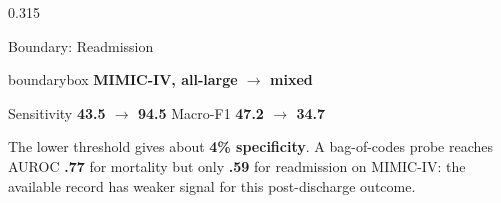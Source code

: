 \documentclass[final,xcolor=table]{beamer}
\begin{document}
\begin{frame}[t]
\begin{columns}[t,totalwidth=\textwidth]
\begin{column}{0.315\textwidth}
    \vspace{0.27cm}

    \begin{block}{Boundary: Readmission}
      \begin{beamercolorbox}[wd=\linewidth,rounded=true,sep=0.45em]{boundarybox}
        \centering
        \textbf{MIMIC-IV, all-large $\rightarrow$ mixed}\par\vspace{0.16em}
        Sensitivity \textbf{43.5 $\rightarrow$ 94.5}\quad
        Macro-F1 \textbf{47.2 $\rightarrow$ 34.7}
      \end{beamercolorbox}
      \vspace{0.22em}
      \justifying
      The lower threshold gives about \textbf{4\% specificity}. A
      bag-of-codes probe reaches AUROC \textbf{.77} for mortality but only
      \textbf{.59} for readmission on MIMIC-IV: the available record has
      weaker signal for this post-discharge outcome.
    \end{block}
  \end{column}
\end{columns}

\vspace{0.15cm}


\end{frame}
\end{document}
